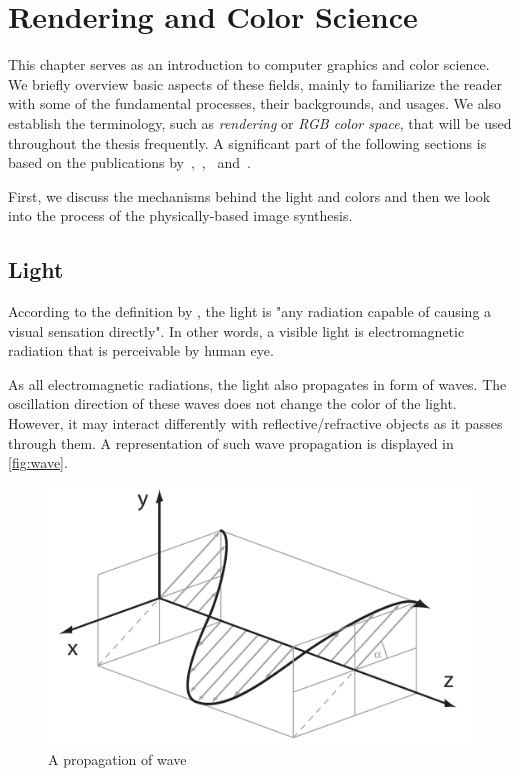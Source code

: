 \chapter{Rendering and Color Science}
\label{chap:render}

This chapter serves as an introduction to computer graphics and color science. We briefly overview basic aspects of these fields, mainly to familiarize the reader with some of the fundamental processes, their backgrounds, and usages. We also establish the terminology, such as \emph{rendering} or \emph{RGB color space}, that will be used throughout the thesis frequently. A significant part of the following sections is based on the publications by~\citet{wyszecki1982color},~\citet{colorScienceSlides},~\citet{nimier2019mitsuba} and~\citet{pharr2016physically}.

First, we discuss the mechanisms behind the light and colors and then we look into the process of the physically-based image synthesis.

\section{Light}

According to the definition by \citet{barbrow1964international}, the light is "any radiation capable of causing a visual sensation directly". In other words, a visible light is electromagnetic radiation that is perceivable by human eye. 

As all electromagnetic radiations, the light also propagates in form of waves. The oscillation direction of these waves does not change the color of the light. However, it may interact differently with reflective/refractive objects as it passes through them. A representation of such wave propagation is displayed in \autoref{fig:wave}.

\begin{figure}[h]
	\centering
	\includegraphics[width=0.7\linewidth]{img/wave.png}
	\caption{A propagation of wave~\cite{colorScienceSlides}}
	\label{fig:wave}
\end{figure}


